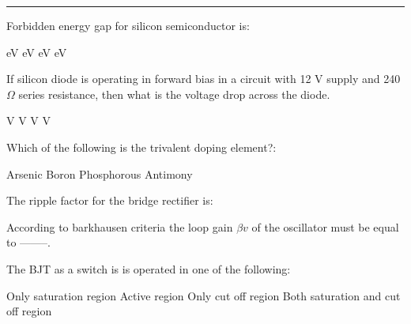 \documentclass[a4, 12pt, addpoints]{exam}
\begin{document}
\vspace{0.1in}
\hrule 
\vspace{0.1in}
\begin{questions}
\question Forbidden energy gap for silicon semiconductor is:\\[0.3cm]
\begin{oneparchoices}
 eV
 eV
 eV
 eV
\end{oneparchoices} 
\question If silicon diode is operating in forward bias in a circuit with 12 V supply and 240 $\Omega$ series resistance, then what is the voltage drop across the diode. \\[0.3cm]
\begin{oneparchoices}
 V
 V
 V
 V
\end{oneparchoices}  
\question Which of the following is the trivalent doping element?:\\[0.3cm]
\begin{oneparchoices}
\choice Arsenic
\choice Boron
\choice Phosphorous
\choice Antimony
\end{oneparchoices}  
\question The ripple factor for the bridge rectifier is:\\[0.3cm]
\begin{oneparchoices}
\end{oneparchoices}  
\question According to barkhausen criteria the loop gain $\beta v$ of the oscillator must be equal to --------.\\[0.3cm]
\begin{oneparchoices}
\end{oneparchoices} 
\question The BJT as a switch is is operated in one of the following:
\begin{oneparchoices}
\choice Only saturation region
\choice Active region
\choice Only cut off region
\choice Both saturation and cut off region
\end{oneparchoices}  


\end{questions}
\end{document}

